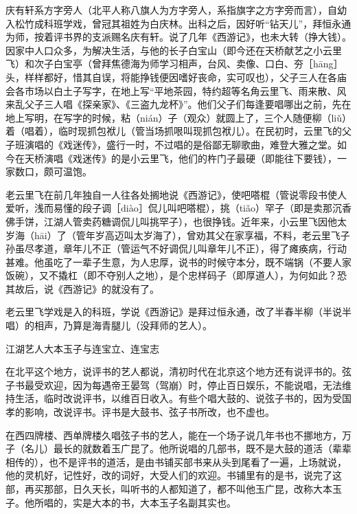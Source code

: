 \documentclass[12pt,UTF8]{ctexbook}
\begin{document}
庆有轩系方字旁人（北平人称八旗人为方字旁人，系指旗字之方字旁而言），自幼入松竹成科班学戏，曾冠其祖姓为白庆林。出科之后，因好听“钻天儿”，拜恒永通为师，按着评书界的支派赐名庆有轩。说了几年《西游记》，也未大转（挣大钱）。因家中人口众多，为解决生活，与他的长子白宝山（即今还在天桥献艺之小云里飞）和次子白宝亭（曾拜焦德海为师学习相声，台风、卖像、口白、夯［hāng］头，样样都好，惜其自误，将能挣钱便因嗜好丧命，实可叹也），父子三人在各庙会各市场以白土子写字，在地上写“平地茶园，特约超等名角云里飞、雨来散、风来乱父子三人唱《探亲家》、《三盗九龙杯》”。他们父子们每逢要唱哪出之前，先在地上写明，在写字的时候，粘（nián）子（观众）就圆上了，三个人随便柳（liǔ）着（唱着），临时现抓包袱儿（管当场抓哏叫现抓包袱儿）。在民初时，云里飞的父子班演唱的《戏迷传》，盛行一时，不过唱的是俗鄙无聊歌曲，难登大雅之堂。如今在天桥演唱《戏迷传》的是小云里飞，他们的杵门子最硬（即能往下要钱），一家数口，颇可温饱。

老云里飞在前几年独自一人往各处搁地说《西游记》，使吧嗒棍（管说零段书使人爱听，浅而易懂的段子调［diào］侃儿叫吧嗒棍），挑（tiǎo）罕子（即是卖那沉香佛手饼，江湖人管卖药糖调侃儿叫挑罕子），也很挣钱。近年来，小云里飞因他太岁海（hāi）了（管年岁高迈叫太岁海了），曾劝其父在家享福，不料，老云里飞子孙虽尽孝道，章年儿不正（管运气不好调侃儿叫章年儿不正），得了瘫痪病，行动甚难。他虽吃了一辈子生意，为人忠厚，说书的时候守本分，既不端锅（不要人家饭碗），又不撬杠（即不夺别人之地），是个忠样码子（即厚道人），为何如此？恐其故后，说《西游记》的就没有了。

老云里飞学戏是入的科班，学说《西游记》是拜过恒永通，改了半春半柳（半说半唱）的相声，乃算是海青腿儿（没拜师的艺人）。





江湖艺人大本玉子与连宝立、连宝志


在北平这个地方，说评书的艺人都说，清初时代在北京这个地方还有说评书的。弦子书最受欢迎，因为每遇帝王晏驾（驾崩）时，停止百日娱乐，不能说唱，无法维持生活，临时改说评书，以维百日收入。有些个唱大鼓的、说弦子书的，因为受国孝的影响，改说评书。评书是大鼓书、弦子书所改，也不虚也。

在西四牌楼、西单牌楼久唱弦子书的艺人，能在一个场子说几年书也不挪地方，万子（名儿）最长的就数着玉广昆了。他所说唱的几部书，既不是大鼓的道活（辈辈相传的），也不是评书的道活，是由书铺买部书来从头到尾看了一遍，上场就说，他的灵机好，记性好，改的词好，大受人们的欢迎。书铺里有的是书，说完了这部，再买那部，日久天长，叫听书的人都知道了，都不叫他玉广昆，改称大本玉子。他所唱的，实是大本的书，大本玉子名副其实也。
\end{document}
